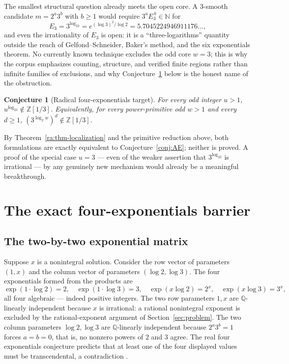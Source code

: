 \documentclass[11pt,oneside]{article}
\newtheorem{conjecture}[theorem]{Conjecture}
\theoremstyle{definition}
\theoremstyle{remark}
\newcommand{\N}{\mathbb N}
\newcommand{\Z}{\mathbb Z}
\newcommand{\Q}{\mathbb Q}
\newcommand{\Zthree}{\Z[1/3]}
\begin{document}
The smallest structural question already meets the open core.  A $3$-smooth candidate
$m=2^a3^b$ with $b\ge1$ would require $3^aE_3^{\,b}\in\N$ for
\[
E_3=3^{\log_23}=e^{(\log3)^2/\log2}=5.7045224946911176\ldots,
\]
and even the irrationality of $E_3$ is open: it is a ``three-logarithms'' quantity outside
the reach of Gelfond--Schneider, Baker's method, and the six exponentials theorem.  No
currently known technique excludes the odd core $w=3$; this is why the corpus emphasizes
counting, structure, and verified finite regions rather than infinite families of
exclusions, and why Conjecture~\ref{ra:conj-radical-target} below is the honest name of the
obstruction.

\begin{conjecture}[Radical four-exponentials target]
\label{ra:conj-radical-target}
For every odd integer $u>1$, $u^{\log_23}\notin\Zthree$.  Equivalently, for every
power-primitive odd $w>1$ and every $d\ge1$, $(3^{\log_2w})^d\notin\Zthree$.
\end{conjecture}

By Theorem~\ref{ra:thm-localization} and the primitive reduction above, both formulations
are exactly equivalent to Conjecture~\ref{conj:AE}; neither is proved.  A proof of the
special case $u=3$ --- even of the weaker assertion that $3^{\log_23}$ is irrational --- by
any genuinely new mechanism would already be a meaningful breakthrough.

\section{The exact four-exponentials barrier}
\label{sec:barrier}
\label{sec:fourexp}

\subsection{The two-by-two exponential matrix}

Suppose $x$ is a nonintegral solution.  Consider the row vector of parameters $(1,x)$ and
the column vector of parameters $(\log2,\log3)$.  The four exponentials formed from the
products are
\[
\exp(1\cdot\log2)=2,\quad
\exp(1\cdot\log3)=3,\quad
\exp(x\log2)=2^x,\quad
\exp(x\log3)=3^x,
\]
all four algebraic --- indeed positive integers.  The two row parameters $1,x$ are
$\Q$-linearly independent because $x$ is irrational: a rational nonintegral exponent is
excluded by the rational-exponent argument of Section~\ref{sec:problem}.  The two column
parameters $\log2,\log3$ are $\Q$-linearly independent because $2^a3^b=1$ forces $a=b=0$,
that is, no nonzero powers of $2$ and $3$ agree.  The real four exponentials conjecture
predicts that at least one of the four displayed values must be transcendental, a
contradiction \cite{Waldschmidt2000}.
\end{document}
